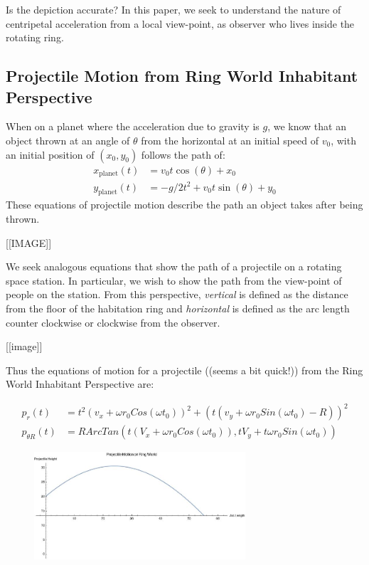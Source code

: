 \documentclass{amsart}
\theoremstyle{definition}
\begin{document}
Is the depiction accurate? In this paper, we seek to understand the
nature of centripetal acceleration from a local view-point, as observer
who lives inside the rotating ring.

\subsection{Projectile Motion from Ring World Inhabitant Perspective}


When on a planet where the acceleration due to gravity is $g$, we know
that an object thrown at an angle of $\theta$ from the horizontal at
an initial speed of $v_0$, with an initial position of $(x_0,y_0)$
follows the path of:
\begin{align*}
  x_{\mathrm{planet}}(t) &=  v_0 t \cos(\theta)  + x_0\\
  y_{\mathrm{planet}}(t) &=  -g/2 t^2 + v_0 t \sin(\theta)  + y_0
\end{align*}
These equations of projectile motion describe the path an object takes
after being thrown.

[[IMAGE]]

We seek analogous equations that show the path of a projectile on a
rotating space station. In particular, we wish to show the path from
the view-point of people on the station.  From this perspective,
\textit{vertical} is defined as the distance from the floor of the
habitation ring and \textit{horizontal} is defined as the arc length
counter clockwise or clockwise from the observer.

[[image]]


Thus the equations of motion for a projectile ((seems a bit quick!))
from the Ring World Inhabitant Perspective are:

\begin{align*}
  p_{r}(t) &= t^2 (v_x + \omega r_0 Cos(\omega t_0))^2 + (t(v_y + \omega
  r_0 Sin(\omega t_0) - R))^2\\
  p_{\theta R}(t) &=R ArcTan(t(V_x + \omega r_0 Cos(\omega t_0)),tV_y +
                    t \omega r_0 Sin(\omega t_0))
\end{align*}

\begin{figure}[h]
  \centering
  \includegraphics[width=0.7\textwidth]{ArclengthProjectileLabeled.jpg}
  \label{fig:shipview}
  \caption{}
\end{figure}
\end{document}
